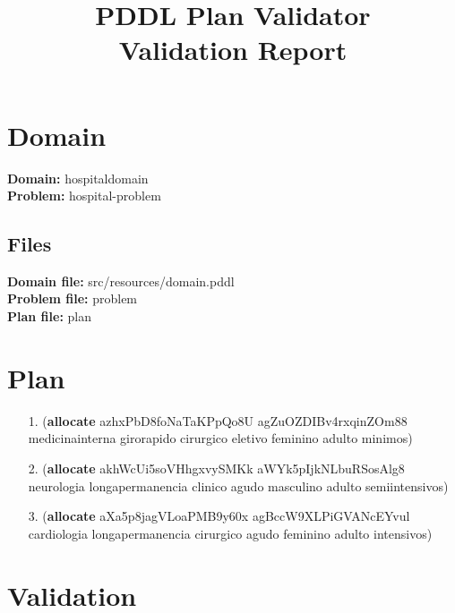 \documentclass{article}
\title{\textbf{PDDL Plan Validator}\\Validation Report}
\date{} %
\begin{document}
\maketitle

\section{Domain}
\textbf{Domain:}  hospitaldomain\\
\textbf{Problem:} hospital-problem

\subsection{Files}
\textbf{Domain file:}  src/resources/domain.pddl \\
\textbf{Problem file:} problem\\
\textbf{Plan file:}    plan

\section{Plan}

\begin{itemize}
    \item[1.] (\textbf{allocate} azhxPbD8foNaTaKPpQo8U agZuOZDIBv4rxqinZOm88 medicinainterna girorapido cirurgico eletivo feminino adulto minimos)
    \item[2.] (\textbf{allocate} akhWcUi5soVHhgxvySMKk aWYk5pIjkNLbuRSosAlg8 neurologia longapermanencia clinico agudo masculino adulto semiintensivos)
    \item[3.] (\textbf{allocate} aXa5p8jagVLoaPMB9y60x agBccW9XLPiGVANcEYvul cardiologia longapermanencia cirurgico agudo feminino adulto intensivos)
\end{itemize}

\section{Validation}
\end{document}
